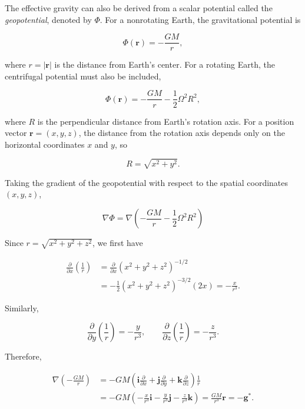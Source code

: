 \documentclass[10pt,twocolumn]{memoir}
\begin{document}
The effective gravity can also be derived from a scalar potential called the \textit{geopotential}, denoted by $\Phi$.
For a nonrotating Earth, the gravitational potential is

\begin{equation}
    \Phi(\mathbf{r}) = -\frac{GM}{r},
\end{equation}

where $r=|\mathbf{r}|$ is the distance from Earth's center. For a rotating Earth, the centrifugal potential must also be included,

\begin{equation}
    \Phi(\mathbf{r}) = -\frac{GM}{r} - \frac{1}{2}\Omega^2R^2,
\end{equation}

where $R$ is the perpendicular distance from Earth's rotation axis. For a position vector $\mathbf{r}=(x,y,z)$, the distance from the rotation axis depends only on the horizontal coordinates $x$ and $y$, so

\begin{equation}
    R=\sqrt{x^2+y^2}.
\end{equation}

Taking the gradient of the geopotential with respect to the spatial coordinates $(x,y,z)$,

\begin{equation}
    \nabla\Phi = \nabla\left(-\frac{GM}{r} - \frac{1}{2}\Omega^2R^2\right)
\end{equation}

Since $r=\sqrt{x^2+y^2+z^2}$, we first have

\begin{equation}
\begin{aligned}
    \frac{\partial}{\partial x}\left(\frac{1}{r}\right)
    &= \frac{\partial}{\partial x} \left(x^2+y^2+z^2\right)^{-1/2} \\
    &= -\frac{1}{2}\left(x^2+y^2+z^2\right)^{-3/2}(2x) = -\frac{x}{r^3}.
\end{aligned}
\end{equation}

Similarly,

\begin{equation}
    \frac{\partial}{\partial y}\left(\frac{1}{r}\right) = -\frac{y}{r^3},
    \qquad
    \frac{\partial}{\partial z}\left(\frac{1}{r}\right) = -\frac{z}{r^3}.
\end{equation}

Therefore,

\begin{equation}
\begin{aligned}
    \nabla\left(-\frac{GM}{r}\right)
    &= -GM\left(\mathbf{i}\frac{\partial}{\partial x}+\mathbf{j}\frac{\partial}{\partial y}+\mathbf{k}\frac{\partial}{\partial z}\right)\frac{1}{r} \\
    &= -GM\left(-\frac{x}{r^3}\mathbf{i}-\frac{y}{r^3}\mathbf{j}-\frac{z}{r^3}\mathbf{k}\right)
    = \frac{GM}{r^3}\mathbf{r}
    = -\mathbf{g}^*.
\end{aligned}
\end{equation}
\end{document}
